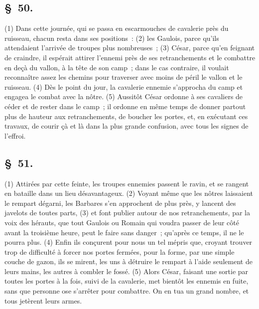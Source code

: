 \documentclass[french,twoside]{book} %
\begin{document}
\subsection[{§ 50.}]{ \textsc{§ 50.} }
\noindent (1) Dans cette journée, qui se passa en escarmouches de cavalerie près du ruisseau, chacun resta dans ses positions : (2) les Gaulois, parce qu’ils attendaient l’arrivée de troupes plus nombreuses ; (3) César, parce qu’en feignant de craindre, il espérait attirer l’ennemi près de ses retranchements et le combattre en deçà du vallon, à la tête de son camp ; dans le cas contraire, il voulait reconnaître assez les chemins pour traverser avec moins de péril le vallon et le ruisseau. (4) Dès le point du jour, la cavalerie ennemie s’approcha du camp et engagea le combat avec la nôtre. (5) Aussitôt César ordonne à ses cavaliers de céder et de rester dans le camp ; il ordonne en même temps de donner partout plus de hauteur aux retranchements, de boucher les portes, et, en exécutant ces travaux, de courir çà et là dans la plus grande confusion, avec tous les signes de l’effroi.
\subsection[{§ 51.}]{ \textsc{§ 51.} }
\noindent (1) Attirées par cette feinte, les troupes ennemies passent le ravin, et se rangent en bataille dans un lieu désavantageux. (2) Voyant même que les nôtres laissaient le rempart dégarni, les Barbares s’en approchent de plus près, y lancent des javelots de toutes parts, (3) et font publier autour de nos retranchements, par la voix des hérauts, que tout Gaulois ou Romain qui voudra passer de leur côté avant la troisième heure, peut le faire sans danger ; qu’après ce temps, il ne le pourra plus. (4) Enfin ils conçurent pour nous un tel mépris que, croyant trouver trop de difficulté à forcer nos portes fermées, pour la forme, par une simple couche de gazon, ils se mirent, les uns à détruire le rempart à l’aide seulement de leurs mains, les autres à combler le fossé. (5) Alors César, faisant une sortie par toutes les portes à la fois, suivi de la cavalerie, met bientôt les ennemis en fuite, sans que personne ose s’arrêter pour combattre. On en tua un grand nombre, et tous jetèrent leurs armes.
\end{document}
